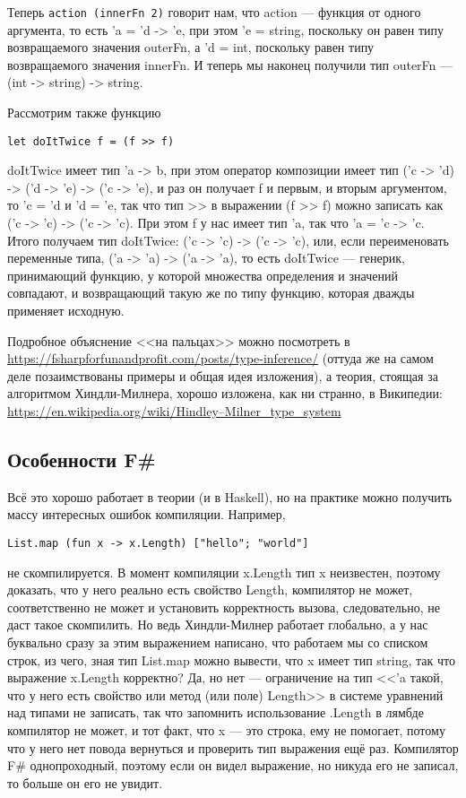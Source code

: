 \documentclass{../../text-style}
\begin{document}
Теперь \texttt{action (innerFn 2)} говорит нам, что action --- функция от одного аргумента, то есть 'a = 'd -> 'e, при этом 'e = string, поскольку он равен типу возвращаемого значения outerFn, а 'd = int, поскольку равен типу возвращаемого значения innerFn. И теперь мы наконец получили тип outerFn --- (int -> string) -> string.

Рассмотрим также функцию

\begin{verbatim}
let doItTwice f = (f >> f)
\end{verbatim}

doItTwice имеет тип 'a -> b, при этом оператор композиции имеет тип ('c -> 'd) -> ('d -> 'e) -> ('c -> 'e), и раз он получает f и первым, и вторым аргументом, то 'c = 'd и 'd = 'e, так что тип >> в выражении (f >> f) можно записать как ('c -> 'c) -> ('c -> 'c). При этом f у нас имеет тип 'a, так что 'a = 'c -> 'c. Итого получаем тип doItTwice: ('c -> 'c) -> ('c -> 'c), или, если переименовать переменные типа, ('a -> 'a) -> ('a -> 'a), то есть doItTwice --- генерик, принимающий функцию, у которой множества определения и значений совпадают, и возвращающий такую же по типу функцию, которая дважды применяет исходную.

Подробное объяснение <<на пальцах>> можно посмотреть в \url{https://fsharpforfunandprofit.com/posts/type-inference/} (оттуда же на самом деле позаимствованы примеры и общая идея изложения), а теория, стоящая за алгоритмом Хиндли-Милнера, хорошо изложена, как ни странно, в Википедии: \url{https://en.wikipedia.org/wiki/Hindley–Milner_type_system}

\subsection{Особенности F\#}

Всё это хорошо работает в теории (и в Haskell), но на практике можно получить массу интересных ошибок компиляции. Например,

\begin{verbatim}
List.map (fun x -> x.Length) ["hello"; "world"]
\end{verbatim}

не скомпилируется. В момент компиляции x.Length тип x неизвестен, поэтому доказать, что у него реально есть свойство Length, компилятор не может, соответственно не может и установить корректность вызова, следовательно, не даст такое скомпилить. Но ведь Хиндли-Милнер работает глобально, а у нас буквально сразу за этим выражением написано, что работаем мы со списком строк, из чего, зная тип List.map можно вывести, что x имеет тип string, так что выражение x.Length корректно? Да, но нет --- ограничение на тип <<'a такой, что у него есть свойство или метод (или поле) Length>> в системе уравнений над типами не записать, так что запомнить использование .Length в лямбде компилятор не может, и тот факт, что x --- это строка, ему не помогает, потому что у него нет повода вернуться и проверить тип выражения ещё раз. Компилятор F\# однопроходный, поэтому если он видел выражение, но никуда его не записал, то больше он его не увидит.
\end{document}
